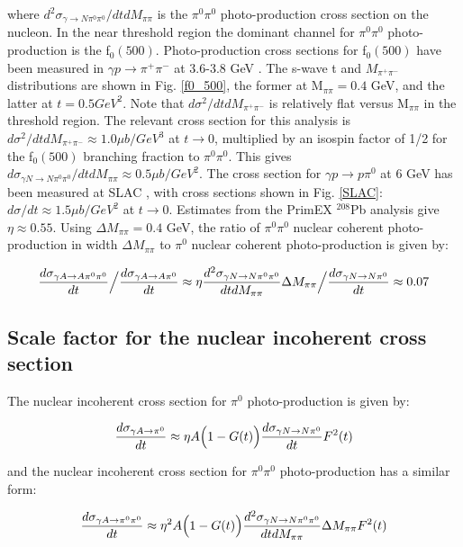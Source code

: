 where $d^2\sigma_{\gamma \rightarrow N\pi^0 \pi^0} / dt dM_{\pi \pi}$ is the $\pi^0 \pi^0$ photo-production cross section on the nucleon.
  In the near threshold region the dominant channel for $\pi^0 \pi^0$ photo-production is the f$_0(500)$.    Photo-production cross sections for f$_0(500)$ have been measured in 
  $\gamma p \rightarrow \pi^+ \pi^-$ at 3.6-3.8 GeV \cite{Battaglieri:2009aa}.   The s-wave t and $M_{\pi^+ \pi^-}$ distributions are shown in Fig. \ref{f0_500}, the former at M$_{\pi \pi}=0.4$ GeV, and the latter at $t=0.5 GeV^2$.  Note that  
  $d\sigma^2 / dt dM_{\pi^+ \pi^-}$ is relatively flat versus M$_{\pi \pi}$ in the threshold region. The relevant cross section for this analysis is $d\sigma^2 / dt dM_{\pi^+ \pi^-} \approx 1.0 \mu b/GeV^3$ at $t\rightarrow 0$, multiplied by an isospin factor of 1/2 for the f$_0(500)$ branching fraction to $\pi^0 \pi^0$.   This gives $d \sigma_{\gamma N \rightarrow N \pi^0 \pi^0} / dt dM_{\pi \pi} \approx 0.5 \mu b / GeV^2 $. The cross section for  $\gamma p \rightarrow  p \pi^0$ at 6 GeV has been measured at SLAC \cite{Anderson:1971}, with cross sections shown in Fig. \ref{SLAC}:   $d\sigma / dt \approx 1.5 \mu b/GeV^2$ at $t \rightarrow 0$.   Estimates from the PrimEX $^{208}$Pb analysis give $\eta \approx 0.55$.  Using $\Delta M_{\pi \pi} = 0.4$ GeV, the ratio of  $\pi^0 \pi^0$ nuclear coherent photo-production in width  $\Delta M_{\pi \pi}$  to $\pi^0$ nuclear coherent photo-production is given by: 

$$  {d\sigma_{\gamma A \rightarrow A \pi^0 \pi^0} \over dt}  \Big/ { d\sigma_{\gamma A \rightarrow A \pi^0} \over dt}  \approx \eta 
 {d^2\sigma_{\gamma N \rightarrow N \pi^0 \pi^0} \over dt dM_{\pi \pi} } \Delta M_{\pi \pi} \Big/ { d\sigma_{\gamma N \rightarrow N \pi^0} \over dt} \approx 0.07 $$

\subsection{Scale factor for the nuclear incoherent cross section}

The nuclear incoherent cross section for  $\pi^0$ photo-production is given by: 

$$ {d\sigma_{\gamma A \rightarrow   \pi^0 } \over dt } \approx \eta A \Big(1 -G(t) \Big){ d\sigma_{\gamma N \rightarrow N \pi^0 } \over dt } F^2(t) $$

and the nuclear incoherent cross section for  $\pi^0 \pi^0$ photo-production has a similar form: 

$$ {d\sigma_{\gamma A \rightarrow   \pi^0 \pi^0 } \over dt } \approx \eta^2 A \Big(1 -G(t) \Big){ d^2\sigma_{\gamma N \rightarrow N \pi^0 \pi^0 } \over dt dM_{\pi \pi}} \Delta M_{\pi \pi} F^2(t) $$

